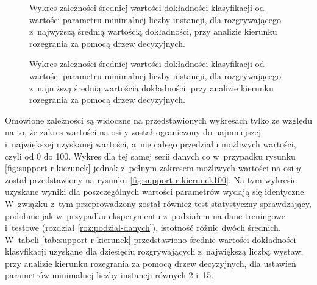 \documentclass[a4paper,twoside,12pt]{book}
\begin{document}
\begin{figure}
\centering
{}
\caption{Wykres zależności średniej wartości dokładności klasyfikacji od wartości parametru minimalnej liczby instancji, dla rozgrywającego z~najwyższą średnią wartością dokładności, przy analizie kierunku rozegrania za pomocą drzew decyzyjnych.}
\label{fig:support-r-kierunek-best}
\end{figure}

\begin{figure}
\centering
{}
\caption{Wykres zależności średniej wartości dokładności klasyfikacji od wartości parametru minimalnej liczby instancji, dla rozgrywającego z~najniższą średnią wartością dokładności, przy analizie kierunku rozegrania za pomocą drzew decyzyjnych.}
\label{fig:support-r-kierunek-worst}
\end{figure}

Omówione zależności są widoczne na przedstawionych wykresach tylko ze wzglę\-du na to, że zakres wartości na osi y został ograniczony do najmniejszej i~największej uzyskanej wartości, a~nie całego przedziału możliwych wartości, czyli od 0 do 100. Wykres dla tej samej serii danych co w~przypadku rysunku \ref{fig:support-r-kierunek} jednak z~pełnym zakresem możliwych wartości na osi $y$ został przedstawiony na rysunku \ref{fig:support-r-kierunek100}. Na tym wykresie uzyskane wyniki dla poszczególnych wartości parametrów wydają się identyczne. W~związku z~tym przeprowadzony został również test statystyczny sprawdzający, podobnie jak w~przypadku eksperymentu z~podziałem na dane treningowe i~testowe (rozdział \ref{roz:podzial-danych}), istotność różnic dwóch średnich. W~tabeli \ref{tab:support-r-kierunek} przedstawiono średnie wartości dokładności klasyfikacji uzyskane dla dziesięciu rozgrywających z~największą liczbą wystaw, przy analizie kierunku rozegrania za pomocą drzew decyzyjnych, dla ustawień parametrów minimalnej liczby instancji równych 2 i~15.
\end{document}
